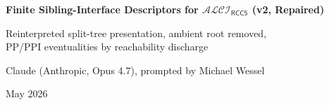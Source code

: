 \documentclass[11pt]{article}
\theoremstyle{definition}
\theoremstyle{remark}
\newcommand{\ALCIRCC}[1]{\mathcal{ALCI}_{\mathsf{RCC#1}}}
\begin{document}
\begin{center}
{\LARGE\bfseries Finite Sibling-Interface Descriptors for $\ALCIRCC{5}$ (v2, Repaired)\par}
\vspace{0.5em}
{\large Reinterpreted split-tree presentation, ambient root removed,\\
 PP/PPI eventualities by reachability discharge}\par
\vspace{0.75em}
{\normalsize Claude (Anthropic, Opus 4.7), prompted by Michael Wessel}\par
\vspace{0.45em}
{\small May 2026}
\end{center}

\begin{center}
\end{center}
\end{document}
